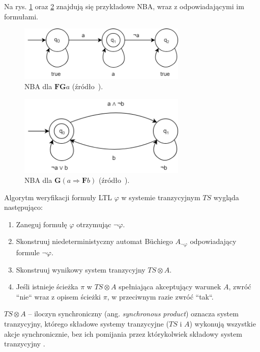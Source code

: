 Na rys. \ref{fig:nba1} oraz \ref{fig:nba2} znajdują się przykładowe NBA, wraz z odpowiadającymi im formułami.

\begin{figure}[h]
    \centering
    \includegraphics[width=8cm,keepaspectratio]{img/nba1.png}
    \caption{NBA dla $\mathbf{FG}a$ (źródło~\cite{Bai08}).}
    \label{fig:nba1}
\end{figure}
\begin{figure}[h]
    \centering
    \includegraphics[width=8cm,keepaspectratio]{img/nba2.png}
    \caption{NBA dla $\mathbf{G}(a \Rightarrow \mathbf{F}b)$ (źródło~\cite{Bai08}).}
    \label{fig:nba2}
\end{figure}

\noindent
Algorytm weryfikacji formuły LTL $\varphi$ w systemie tranzycyjnym $TS$ wygląda następująco:
\begin{enumerate}
    \item Zaneguj formułę $\varphi$ otrzymując $\neg\varphi$.
    \item Skonstruuj niedeterministyczny automat Büchiego $A_{\neg\varphi}$ odpowiadający formule $\neg\varphi$.
    \item Skonstruuj wynikowy system tranzycyjny $TS \otimes A$.
    \item Jeśli istnieje ścieżka $\pi$ w $TS \otimes A$ spełniająca akceptujący warunek $A$, zwróć ``nie`` wraz z opisem ścieżki $\pi$, w przeciwnym razie zwróć ``tak``.
\end{enumerate}

\noindent
$TS \otimes A$ -- iloczyn synchroniczny (ang. \textit{synchronous product}) oznacza system tranzycyjny, którego składowe systemy tranzycyjne ($TS$ i $A$) wykonują wszystkie akcje synchronicznie, bez ich pomijania przez którykolwiek składowy system tranzycyjny \cite{Bai08}.


